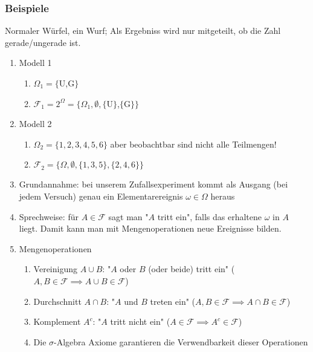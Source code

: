\documentclass[10pt]{article}
\newcommand{\enumstart}{\begin{enumerate}}
\newcommand{\enumend}{\end{enumerate}}
\newcommand{\F}{\mathcal{F}}
\begin{document}
\subsubsection{Beispiele}
Normaler Würfel, ein Wurf; Als Ergebniss wird nur mitgeteilt, ob die Zahl gerade/ungerade ist.
\enumstart
	\item Modell 1
	\enumstart
		\item $\Omega_1 = \{$U,G$\}$
		\item $\F_1 = 2^{\Omega} = \{\Omega_1, \emptyset, \{$U$\}$,$\{$G$\}\}$
	\enumend
	\item Modell 2
	\enumstart
		\item $\Omega_2 = \{1,2,3,4,5,6\}$ aber beobachtbar sind nicht alle Teilmengen!
		\item $\F_2 = \{\Omega, \emptyset, \{1,3,5\},\{2,4,6\}\}$
	\enumend
	\item Grundannahme: bei unserem Zufallsexperiment kommt als Ausgang (bei jedem Versuch)  genau ein Elementarereignis $\omega \in \Omega$ heraus
	\item Sprechweise: für $A \in \F$ sagt man "$A$ tritt ein", falls das erhaltene $\omega$ in $A$ liegt. Damit kann man mit Mengenoperationen neue Ereignisse bilden.
	\item Mengenoperationen
	\enumstart
		\item Vereinigung $A \cup B$: "$A$ oder $B$ (oder beide) tritt ein" ($A,B \in \F \implies A \cup B \in \F$)
		\item Durchschnitt $A \cap B$: "$A$ und $B$ treten ein" ($A,B \in \F \implies A \cap B \in \F$)
		\item Komplement $A^c$: "$A$ tritt nicht ein" ($A \in \F \implies A^c \in \F$)
		\item Die $\sigma$-Algebra Axiome garantieren die Verwendbarkeit dieser Operationen
	\enumend
\enumend
\end{document}

